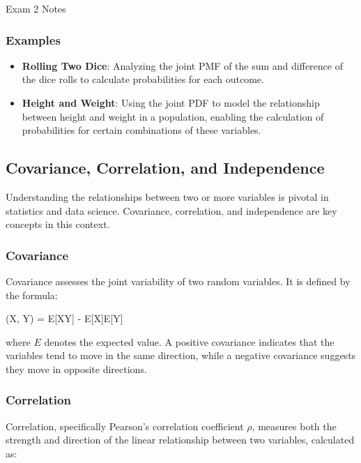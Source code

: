 \begin{examnotes}{Exam 2 Notes}
    \subsubsection*{Examples}
    
    \begin{itemize}
        \item \textbf{Rolling Two Dice}: Analyzing the joint PMF of the sum and difference of the dice rolls to calculate probabilities for each outcome.
        \item \textbf{Height and Weight}: Using the joint PDF to model the relationship between height and weight in a population, enabling the calculation of probabilities for certain combinations 
        of these variables.
    \end{itemize}

    \subsection*{Covariance, Correlation, and Independence}

    Understanding the relationships between two or more variables is pivotal in statistics and data science. Covariance, correlation, and independence are key concepts in this context.
    
    \subsubsection*{Covariance}
    
    Covariance assesses the joint variability of two random variables. It is defined by the formula:
    
    \begin{center}
        \begin{highlightbox}
            (X, Y) = E[XY] - E[X]E[Y]
        \end{highlightbox}
    \end{center}
    where $E$ denotes the expected value. A positive covariance indicates that the variables tend to move in the same direction, while a negative covariance suggests they move in opposite directions.
    
    \subsubsection*{Correlation}
    
    Correlation, specifically Pearson's correlation coefficient $\rho$, measures both the strength and direction of the linear relationship between two variables, calculated as:
    

\end{examnotes}
